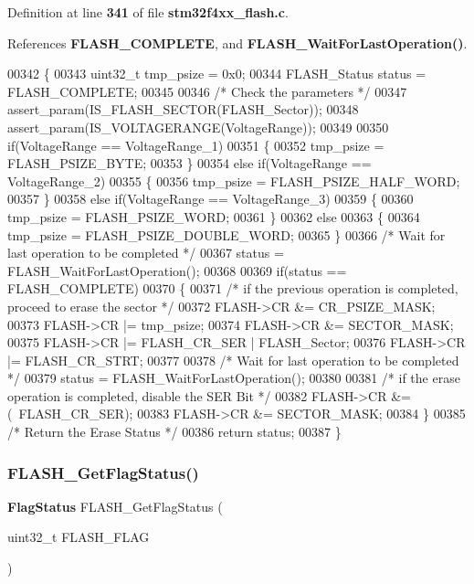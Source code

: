 Definition at line \textbf{ 341} of file \textbf{ stm32f4xx\+\_\+flash.\+c}.



References \textbf{ F\+L\+A\+S\+H\+\_\+\+C\+O\+M\+P\+L\+E\+TE}, and \textbf{ F\+L\+A\+S\+H\+\_\+\+Wait\+For\+Last\+Operation()}.


\begin{DoxyCode}
00342 \{
00343   uint32\_t tmp\_psize = 0x0;
00344   FLASH_Status status = FLASH_COMPLETE;
00345 
00346   \textcolor{comment}{/* Check the parameters */}
00347   assert_param(IS_FLASH_SECTOR(FLASH\_Sector));
00348   assert_param(IS_VOLTAGERANGE(VoltageRange));
00349   
00350   \textcolor{keywordflow}{if}(VoltageRange == VoltageRange_1)
00351   \{
00352      tmp\_psize = FLASH_PSIZE_BYTE;
00353   \}
00354   \textcolor{keywordflow}{else} \textcolor{keywordflow}{if}(VoltageRange == VoltageRange_2)
00355   \{
00356     tmp\_psize = FLASH_PSIZE_HALF_WORD;
00357   \}
00358   \textcolor{keywordflow}{else} \textcolor{keywordflow}{if}(VoltageRange == VoltageRange_3)
00359   \{
00360     tmp\_psize = FLASH_PSIZE_WORD;
00361   \}
00362   \textcolor{keywordflow}{else}
00363   \{
00364     tmp\_psize = FLASH_PSIZE_DOUBLE_WORD;
00365   \}
00366   \textcolor{comment}{/* Wait for last operation to be completed */}
00367   status = FLASH_WaitForLastOperation();
00368   
00369   \textcolor{keywordflow}{if}(status == FLASH_COMPLETE)
00370   \{ 
00371     \textcolor{comment}{/* if the previous operation is completed, proceed to erase the sector */}
00372     FLASH->CR &= CR_PSIZE_MASK;
00373     FLASH->CR |= tmp\_psize;
00374     FLASH->CR &= SECTOR_MASK;
00375     FLASH->CR |= FLASH_CR_SER | FLASH\_Sector;
00376     FLASH->CR |= FLASH_CR_STRT;
00377     
00378     \textcolor{comment}{/* Wait for last operation to be completed */}
00379     status = FLASH_WaitForLastOperation();
00380     
00381     \textcolor{comment}{/* if the erase operation is completed, disable the SER Bit */}
00382     FLASH->CR &= (~FLASH_CR_SER);
00383     FLASH->CR &= SECTOR_MASK; 
00384   \}
00385   \textcolor{comment}{/* Return the Erase Status */}
00386   \textcolor{keywordflow}{return} status;
00387 \}
\end{DoxyCode}
\mbox{\label{group__FLASH_gae3fb545e32f21501ca27d4380e0f2088}} 
\subsubsection{F\+L\+A\+S\+H\+\_\+\+Get\+Flag\+Status()}
{\footnotesize\ttfamily \textbf{ Flag\+Status} F\+L\+A\+S\+H\+\_\+\+Get\+Flag\+Status (\begin{DoxyParamCaption}\item[{uint32\+\_\+t}]{F\+L\+A\+S\+H\+\_\+\+F\+L\+AG }\end{DoxyParamCaption})}



